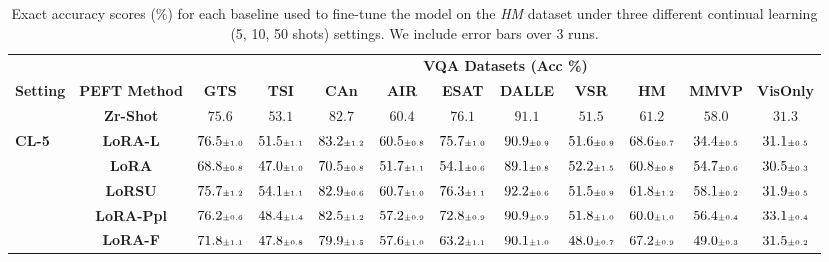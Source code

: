 \begin{table}
\caption{Exact accuracy scores (\%) for each baseline used to fine-tune the model on the \emph{HM} dataset under three different continual learning (5, 10, 50 shots) settings. We include error bars over 3 runs.}
 \label{table:fine_tune_llm_hm}
 \vskip 0.15in
\begin{center}
\begin{small}
\begingroup
\setlength{\tabcolsep}{3.6pt}
\begin{tabular}{l c c c c c c c c c c c}
\toprule
 & & \multicolumn{10}{c}{\textbf{VQA Datasets (Acc \%)}}  \\
\cmidrule(lr){3-12}
\textbf{Setting} & \textbf{PEFT Method}  & \textbf{GTS} & \textbf{TSI} & \textbf{CAn} & \textbf{AIR} & \textbf{ESAT} & \textbf{DALLE} & \textbf{VSR} & \textbf{HM} & \textbf{MMVP} & \textbf{VisOnly} \\
\midrule
 & \textbf{Zr-Shot} & $75.6$ & $53.1$ & $82.7$ & $60.4$ & $76.1$ & $91.1$ & $51.5$ & $61.2$ & $58.0$ & $31.3$ \\
\midrule
\multirow{6}{*}{\textbf{CL-5}} & \textbf{LoRA-L} & $76.5 \mbox{\tiny\ensuremath{\pm 1.0}}$ & $51.5 \mbox{\tiny\ensuremath{\pm 1.1}}$ & $83.2 \mbox{\tiny\ensuremath{\pm 1.2}}$ & $60.5 \mbox{\tiny\ensuremath{\pm 0.8}}$ & $75.7 \mbox{\tiny\ensuremath{\pm 1.0}}$ & $90.9 \mbox{\tiny\ensuremath{\pm 0.9}}$ & $51.6 \mbox{\tiny\ensuremath{\pm 0.9}}$ & $68.6 \mbox{\tiny\ensuremath{\pm 0.7}}$ & $34.4 \mbox{\tiny\ensuremath{\pm 0.5}}$ & $31.1 \mbox{\tiny\ensuremath{\pm 0.5}}$ \\
& \textbf{LoRA} & $68.8 \mbox{\tiny\ensuremath{\pm 0.8}}$ & $47.0 \mbox{\tiny\ensuremath{\pm 1.0}}$ & $70.5 \mbox{\tiny\ensuremath{\pm 0.8}}$ & $51.7 \mbox{\tiny\ensuremath{\pm 1.1}}$ & $54.1 \mbox{\tiny\ensuremath{\pm 0.6}}$ & $89.1 \mbox{\tiny\ensuremath{\pm 0.8}}$ & $52.2 \mbox{\tiny\ensuremath{\pm 1.5}}$ & $60.8 \mbox{\tiny\ensuremath{\pm 0.8}}$ & $54.7 \mbox{\tiny\ensuremath{\pm 0.6}}$ & $30.5 \mbox{\tiny\ensuremath{\pm 0.3}}$ \\
& \textbf{LoRSU} & $75.7 \mbox{\tiny\ensuremath{\pm 1.2}}$ & $54.1 \mbox{\tiny\ensuremath{\pm 1.1}}$ & $82.9 \mbox{\tiny\ensuremath{\pm 0.6}}$ & $60.7 \mbox{\tiny\ensuremath{\pm 1.0}}$ & $76.3 \mbox{\tiny\ensuremath{\pm 1.1}}$ & $92.2 \mbox{\tiny\ensuremath{\pm 0.6}}$ & $51.5 \mbox{\tiny\ensuremath{\pm 0.9}}$ & $61.8 \mbox{\tiny\ensuremath{\pm 1.2}}$ & $58.1 \mbox{\tiny\ensuremath{\pm 0.2}}$ & $31.9 \mbox{\tiny\ensuremath{\pm 0.5}}$ \\
& \textbf{LoRA-Ppl} & $76.2 \mbox{\tiny\ensuremath{\pm 0.6}}$ & $48.4 \mbox{\tiny\ensuremath{\pm 1.4}}$ & $82.5 \mbox{\tiny\ensuremath{\pm 1.2}}$ & $57.2 \mbox{\tiny\ensuremath{\pm 0.9}}$ & $72.8 \mbox{\tiny\ensuremath{\pm 0.9}}$ & $90.9 \mbox{\tiny\ensuremath{\pm 0.9}}$ & $51.8 \mbox{\tiny\ensuremath{\pm 1.0}}$ & $60.0 \mbox{\tiny\ensuremath{\pm 1.0}}$ & $56.4 \mbox{\tiny\ensuremath{\pm 0.4}}$ & $33.1 \mbox{\tiny\ensuremath{\pm 0.4}}$ \\
& \textbf{LoRA-F} & $71.8 \mbox{\tiny\ensuremath{\pm 1.1}}$ & $47.8 \mbox{\tiny\ensuremath{\pm 0.8}}$ & $79.9 \mbox{\tiny\ensuremath{\pm 1.5}}$ & $57.6 \mbox{\tiny\ensuremath{\pm 1.0}}$ & $63.2 \mbox{\tiny\ensuremath{\pm 1.1}}$ & $90.1 \mbox{\tiny\ensuremath{\pm 1.0}}$ & $48.0 \mbox{\tiny\ensuremath{\pm 0.7}}$ & $67.2 \mbox{\tiny\ensuremath{\pm 0.9}}$ & $49.0 \mbox{\tiny\ensuremath{\pm 0.3}}$ & $31.5 \mbox{\tiny\ensuremath{\pm 0.2}}$ \\

\end{tabular}
\end{small}
\end{center}
\end{table}
